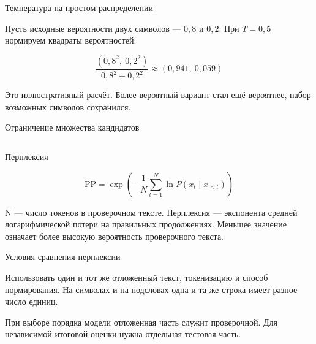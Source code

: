 \documentclass[aspectratio=169,12pt]{beamer}
\begin{document}
\begin{frame}{Температура на простом распределении}
\color{ink}
{\small Пусть исходные вероятности двух символов — $0{,}8$ и $0{,}2$. При $T=0{,}5$ нормируем квадраты вероятностей:
\par\vspace{0.6em}\[\displaystyle \frac{(0{,}8^2,\ 0{,}2^2)}{0{,}8^2+0{,}2^2}\approx(0{,}941,\ 0{,}059)\]
\par\vspace{0.6em}Это иллюстративный расчёт. Более вероятный вариант стал ещё вероятнее, набор возможных символов сохранился.}
\end{frame}

\begin{frame}{Ограничение множества кандидатов}
\color{ink}
\begin{columns}[T,onlytextwidth]
\end{columns}
\end{frame}

\begin{frame}{Перплексия}
\color{ink}
{\small \[\displaystyle \mathrm{PP}=\exp\left(-\frac1N\sum_{t=1}^{N}\ln P(x_t\mid x_{<t})\right)\]
\par\vspace{0.6em}N — число токенов в проверочном тексте. Перплексия — экспонента средней логарифмической потери на правильных продолжениях. Меньшее значение означает более высокую вероятность проверочного текста.}
\end{frame}

\begin{frame}{Условия сравнения перплексии}
\color{ink}
{\small Использовать один и тот же отложенный текст, токенизацию и способ нормирования. На символах и на подсловах одна и та же строка имеет разное число единиц.
\par\vspace{0.6em}При выборе порядка модели отложенная часть служит проверочной. Для независимой итоговой оценки нужна отдельная тестовая часть.}
\end{frame}
\end{document}
